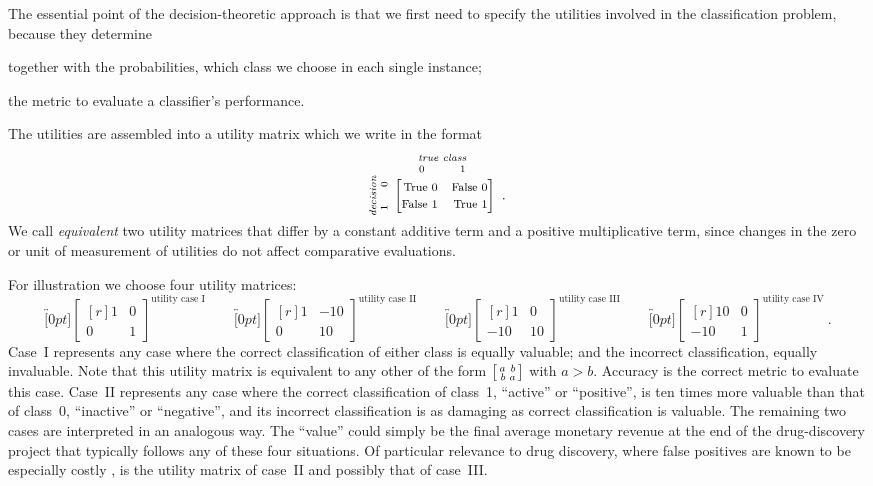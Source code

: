 \documentclass[\ifafour a4paper,12pt,\else a5paper,10pt,\fi%
onecolumn,oneside,article,%
british%
]{memoir}
\theoremstyle{remark}
\theoremstyle{innote}
\renewcommand*{\|}[1][]{\nonscript\:#1\vert\nonscript\:\mathopen{}}
\newcommand*{\umatrix}[4]{\begin{bmatrix*}[r]#1&#2\\#3&#4\end{bmatrix*}}
\newcommand*{\sumatrix}[4]{\begin{bsmallmatrix*}[r]#1&#2\\#3&#4\end{bsmallmatrix*}}
\begin{document}
The essential point of the decision-theoretic approach is that we first need to specify the utilities involved in the classification problem, because they determine
\begin{enumerate*}[label=(\roman*)]
\item together with the probabilities, which class we choose in each single instance;
\item the metric to evaluate a classifier's performance.
\end{enumerate*}
The utilities are assembled into a utility matrix which we write in the format
\begin{equation}
\label{eq:format_matrix}
  \rotatebox[origin=c]{90}{
    \clap{\textit{\parbox{4em}{\centering\scriptsize decision\\$1\hspace{1.5em}0$}}
    }}\ 
    \overbracket[0pt]{\umatrix{
    \text{\footnotesize True 0} }{ \text{\footnotesize False 0}}{
    \text{\footnotesize False 1} }{ \text{\footnotesize True 1}}
      }^{
      \clap{\textit{\parbox{6em}{\centering\scriptsize true class\\$0\hspace{3em}1$}}
    }} \ .
\end{equation}
We call \emph{equivalent} two utility matrices that differ by a constant additive term and a positive multiplicative term, since changes in the zero or unit of measurement of utilities do not affect comparative evaluations.

\smallskip


For illustration we choose four utility matrices:
\begin{equation}
  \label{eq:utility_matrices_demo}
  \overbracket[0pt]{\umatrix{1}{0}{0}{1}}^{\text{utility case I}} \qquad
  \overbracket[0pt]{\umatrix{1}{-10}{0}{10}}^{\text{utility case II}} \qquad
  \overbracket[0pt]{\umatrix{1}{0}{-10}{10}}^{\text{utility case III}} \qquad
  \overbracket[0pt]{\umatrix{10}{0}{-10}{1}}^{\text{utility case IV}} \ .
\end{equation}
Case~I represents any case where the correct classification of either class is equally valuable; and the incorrect classification, equally invaluable. Note that this utility matrix is equivalent to any other of the form $\sumatrix{a}{b}{b}{a}$ with $a>b$. Accuracy is the correct metric to evaluate this case. Case~II represents any case where the correct classification of class~1, \enquote{active} or \enquote{positive}, is ten times more valuable than that of class~0, \enquote{inactive} or \enquote{negative}, and its incorrect classification is as damaging as correct classification is valuable. The remaining two cases are interpreted in an analogous way. The \enquote{value} could simply be the final average monetary revenue at the end of the drug-discovery project that typically follows any of these four situations. Of particular relevance to drug discovery, where false positives are known to be especially costly \autocites{sinketal2010,hingoranietal2019}, is the utility matrix of case~II and possibly that of case~III.
\end{document}
